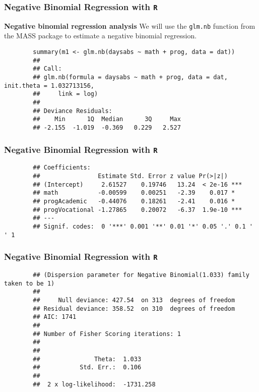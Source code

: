 \documentclass[00-GLMregslides.tex]{subfiles}
\begin{document}
\begin{frame}[fragile]
	\frametitle{Negative Binomial Regression with \texttt{R} }
	\Large
	
\textbf{Negative binomial regression analysis}
	We will use the \texttt{glm.nb} function from the MASS package to estimate a negative binomial regression.
	
	\begin{framed}
		\begin{verbatim}
		summary(m1 <- glm.nb(daysabs ~ math + prog, data = dat))
		## 
		## Call:
		## glm.nb(formula = daysabs ~ math + prog, data = dat, init.theta = 1.032713156, 
		##     link = log)
		## 
		## Deviance Residuals: 
		##    Min      1Q  Median      3Q     Max  
		## -2.155  -1.019  -0.369   0.229   2.527  
			\end{verbatim}
		\end{framed}
		
	\end{frame}
	\begin{frame}[fragile]
		\frametitle{Negative Binomial Regression with \texttt{R} }
		\large
		\begin{framed}
			\begin{verbatim} 
		## Coefficients:
		##                Estimate Std. Error z value Pr(>|z|)    
		## (Intercept)     2.61527    0.19746   13.24  < 2e-16 ***
		## math           -0.00599    0.00251   -2.39    0.017 *  
		## progAcademic   -0.44076    0.18261   -2.41    0.016 *  
		## progVocational -1.27865    0.20072   -6.37  1.9e-10 ***
		## ---
		## Signif. codes:  0 '***' 0.001 '**' 0.01 '*' 0.05 '.' 0.1 ' ' 1
		\end{verbatim}
	\end{framed}
	
\end{frame}
\begin{frame}[fragile]
	\frametitle{Negative Binomial Regression with \texttt{R} }
	\Large
	\begin{framed}
		\begin{verbatim}
		## (Dispersion parameter for Negative Binomial(1.033) family taken to be 1)
		## 
		##     Null deviance: 427.54  on 313  degrees of freedom
		## Residual deviance: 358.52  on 310  degrees of freedom
		## AIC: 1741
		## 
		## Number of Fisher Scoring iterations: 1
		## 
		## 
		##               Theta:  1.033 
		##           Std. Err.:  0.106 
		## 
		##  2 x log-likelihood:  -1731.258
		\end{verbatim}
	\end{framed}
	
	
\end{frame}
\end{document}
